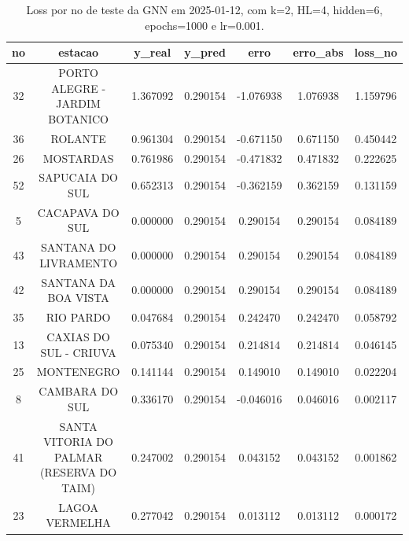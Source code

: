 \begin{table}[h]
\centering
\caption{Loss por no de teste da GNN em 2025-01-12, com k=2, HL=4, hidden=6, epochs=1000 e lr=0.001.}
\label{tab:gnn_loss_k2_hl4_h6_e1000_d20250112}
\begin{tabular}{ccccccc}
\toprule
no & estacao & y\_real & y\_pred & erro & erro\_abs & loss\_no \\
\midrule
32 & PORTO ALEGRE - JARDIM BOTANICO & 1.367092 & 0.290154 & -1.076938 & 1.076938 & 1.159796 \\
36 & ROLANTE & 0.961304 & 0.290154 & -0.671150 & 0.671150 & 0.450442 \\
26 & MOSTARDAS & 0.761986 & 0.290154 & -0.471832 & 0.471832 & 0.222625 \\
52 & SAPUCAIA DO SUL & 0.652313 & 0.290154 & -0.362159 & 0.362159 & 0.131159 \\
5 & CACAPAVA DO SUL & 0.000000 & 0.290154 & 0.290154 & 0.290154 & 0.084189 \\
43 & SANTANA DO LIVRAMENTO & 0.000000 & 0.290154 & 0.290154 & 0.290154 & 0.084189 \\
42 & SANTANA DA BOA VISTA & 0.000000 & 0.290154 & 0.290154 & 0.290154 & 0.084189 \\
35 & RIO PARDO & 0.047684 & 0.290154 & 0.242470 & 0.242470 & 0.058792 \\
13 & CAXIAS DO SUL - CRIUVA & 0.075340 & 0.290154 & 0.214814 & 0.214814 & 0.046145 \\
25 & MONTENEGRO & 0.141144 & 0.290154 & 0.149010 & 0.149010 & 0.022204 \\
8 & CAMBARA DO SUL & 0.336170 & 0.290154 & -0.046016 & 0.046016 & 0.002117 \\
41 & SANTA VITORIA DO PALMAR (RESERVA DO TAIM) & 0.247002 & 0.290154 & 0.043152 & 0.043152 & 0.001862 \\
23 & LAGOA VERMELHA & 0.277042 & 0.290154 & 0.013112 & 0.013112 & 0.000172 \\
\bottomrule
\end{tabular}
\end{table}
